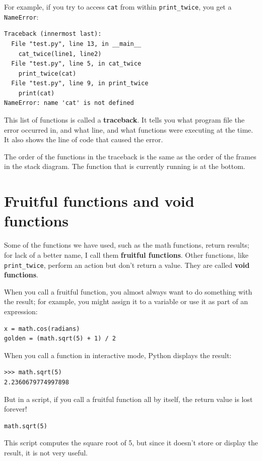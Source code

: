 \documentclass[10pt]{book}
\begin{document}
For example, if you try to access {\tt cat} from within 
\verb"print_twice", you get a {\tt NameError}:

\begin{verbatim}
Traceback (innermost last):
  File "test.py", line 13, in __main__
    cat_twice(line1, line2)
  File "test.py", line 5, in cat_twice
    print_twice(cat)
  File "test.py", line 9, in print_twice
    print(cat)
NameError: name 'cat' is not defined
\end{verbatim}
%
This list of functions is called a {\bf traceback}.  It tells you what
program file the error occurred in, and what line, and what functions
were executing at the time.  It also shows the line of code that
caused the error.

The order of the functions in the traceback is the same as the
order of the frames in the stack diagram.  The function that is
currently running is at the bottom.


\section{Fruitful functions and void functions}

Some of the functions we have used, such as the math functions, return
results; for lack of a better name, I call them {\bf fruitful
  functions}.  Other functions, like \verb"print_twice", perform an
action but don't return a value.  They are called {\bf void
  functions}.

When you call a fruitful function, you almost always
want to do something with the result; for example, you might
assign it to a variable or use it as part of an expression:

\begin{verbatim}
x = math.cos(radians)
golden = (math.sqrt(5) + 1) / 2
\end{verbatim}
%
When you call a function in interactive mode, Python displays
the result:

\begin{verbatim}
>>> math.sqrt(5)
2.2360679774997898
\end{verbatim}
%
But in a script, if you call a fruitful function all by itself,
the return value is lost forever!

\begin{verbatim}
math.sqrt(5)
\end{verbatim}
%
This script computes the square root of 5, but since it doesn't store
or display the result, it is not very useful.
\end{document}
